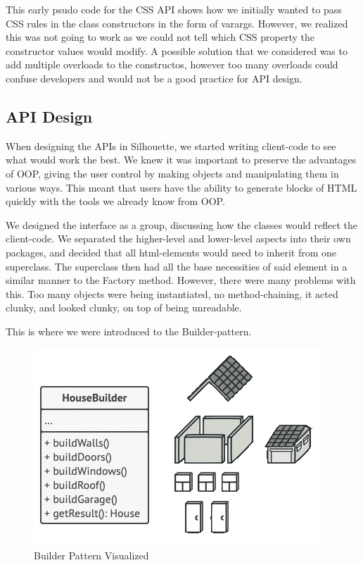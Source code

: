 \documentclass[12pt]{article}
\begin{document}
    This early psudo code for the CSS API shows how we initially wanted to pass CSS rules in the class constructors in the form of varargs. However, we realized this was not going to work as we could not tell which CSS property the constructor values would modify. A possible solution that we considered was to add multiple overloads to the constructos, however too many overloads could confuse developers and would not be a good practice for API design.

    \subsection{API Design}

    When designing the APIs in Silhouette, we started writing client-code to see what would work the best. We knew it was important to preserve the advantages of OOP, giving the user control by making objects and manipulating them in various ways. This meant that users have the ability to generate blocks of HTML quickly with the tools we already know from OOP.

    We designed the interface as a group, discussing how the classes would reflect the client-code. We separated the higher-level and lower-level aspects into their own packages, and decided that all html-elements would need to inherit from one superclass. The superclass then had all the base necessities of said element in a similar manner to the Factory method. However, there were many problems with this. Too many objects were being instantiated, no method-chaining, it acted clunky, and looked clunky, on top of being unreadable.

    This is where we were introduced to the Builder-pattern.

    \begin{figure}[H]
        \centering
        \includegraphics[scale=0.5]{images/builderPattern.png}
        \caption{Builder Pattern Visualized}
    \end{figure}
    
\end{document}
